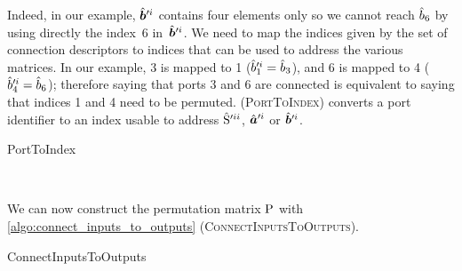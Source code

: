 Indeed, in our example, $\hat{\bm{b}}'^i$ contains four elements only so we cannot reach $\hat{b}_6$ by using directly the index~6 in~$\hat{\bm{b}}'^i$.
We need to map the indices given by the set of connection descriptors to indices that can be used to address the various matrices.
In our example, 3 is mapped to 1 ($\hat{b}'^i_1 = \hat{b}_3$), and 6 is mapped to 4 ($\hat{b}'^i_4 = \hat{b}_6$); therefore saying that ports 3 and 6 are connected is equivalent to saying that indices 1 and 4 need to be permuted.
 (\textsc{PortToIndex}) converts a port identifier to an index usable to address $\hat{\mathrm{S}}'^{ii}$, $\hat{\bm{a}}'^i$ or $\hat{\bm{b}}'^i$.
\begin{algorithm}
    \caption{PortToIndex}
    \label{algo:port_to_index}
    \begin{algorithmic}
         
         
        \\ 
        \EndFunction
    \end{algorithmic}
\end{algorithm}

We can now construct the permutation matrix $\mathrm{P}$ with \cref{algo:connect_inputs_to_outputs} (\textsc{ConnectInputsToOutputs}).

\begin{algorithm}
    \caption{ConnectInputsToOutputs}
    \label{algo:connect_inputs_to_outputs}
    \begin{algorithmic}
         
         
        \EndFor
        \\ 
        \EndFunction
    \end{algorithmic}
\end{algorithm}

